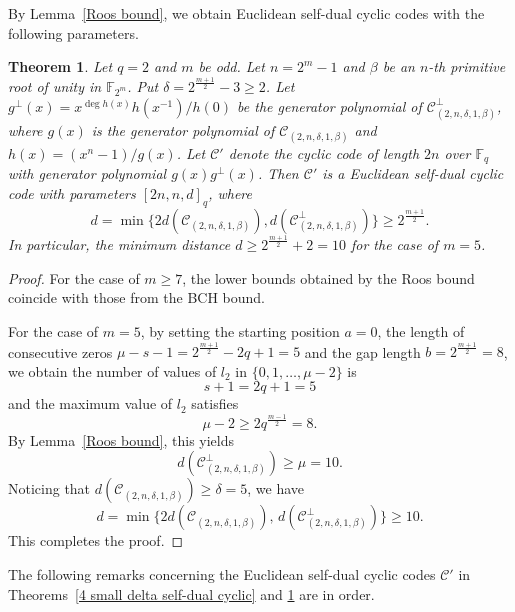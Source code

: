 \documentclass[journal,12pt,onecolumn]{IEEEtran}
\newtheorem{theorem}{Theorem}
\begin{document}
By Lemma~\ref{Roos bound}, we obtain Euclidean self-dual cyclic codes with the following parameters.

\begin{theorem}
    \label{2 small delta self-dual cyclic}
    Let $q=2$ and $m$ be odd. Let $n=2^m-1$ and $\beta$ be an $n$-th primitive root of unity in $\mathbb{F}_{2^m}$. Put $\delta=2^{\frac{m+1}{2}}-3\ge2$. Let $g^\perp(x)=x^{\deg h(x)}h(x^{-1})/h(0)$ be the generator polynomial of $\mathcal{C}_{(2,n,\delta,1,\beta)}^\perp$, where $g(x)$ is the generator polynomial of $\mathcal{C}_{(2,n,\delta,1,\beta)}$ and $h(x)=(x^n-1)/g(x)$. Let $\mathcal{C}'$ denote the cyclic code of length $2n$ over $\mathbb{F}_q$ with generator polynomial $g(x)g^\perp(x)$. Then $\mathcal{C}'$ is a Euclidean self-dual cyclic code with parameters $[2n,n,d]_q$, where \[d=\min\{2d(\mathcal{C}_{(2,n,\delta,1,\beta)}),d(\mathcal{C}_{(2,n,\delta,1,\beta)}^\perp)\}\ge2^\frac{m+1}{2}.\]
    In particular, the minimum distance $d\ge 2^\frac{m+1}{2}+2=10$ for the case of $m=5$.
\end{theorem}

\begin{proof}
    For the case of $m \ge 7$, the lower bounds obtained by the Roos bound coincide with those from the BCH bound.

For the case of $m = 5$, by setting the starting position $a = 0$, the length of consecutive zeros $\mu - s - 1 = 2^{\frac{m+1}{2}} - 2q + 1 = 5$ and the gap length $b = 2^{\frac{m+1}{2}} = 8$, we obtain the number of values of $l_2$ in $\{0,1,\dots,\mu-2\}$ is
\[
s + 1 = 2q + 1 = 5
\]
and the maximum value of $l_2$ satisfies
\[
\mu - 2 \ge 2q^{\frac{m-1}{2}} = 8.
\]
By Lemma~\ref{Roos bound}, this yields
\[
d(\mathcal{C}^\perp_{(2,n,\delta,1,\beta)}) \ge \mu = 10.
\]
Noticing that $d(\mathcal{C}_{(2,n,\delta,1,\beta)}) \ge \delta = 5$, we have
\[
d = \min\{2d(\mathcal{C}_{(2,n,\delta,1,\beta)}),\, d(\mathcal{C}^\perp_{(2,n,\delta,1,\beta)})\} \ge 10.
\]
This completes the proof.
\end{proof}

The following remarks concerning the Euclidean self-dual cyclic codes $\mathcal{C}'$ in Theorems~\ref{4 small delta self-dual cyclic} and \ref{2 small delta self-dual cyclic} are in order.
\end{document}
